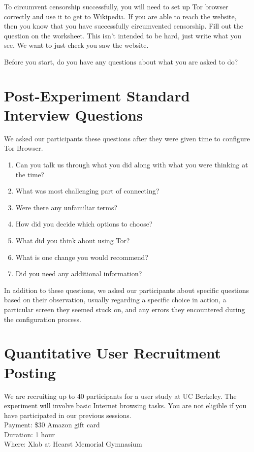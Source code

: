 \documentclass[USenglish,oneside,twocolumn]{article}
\begin{document}
To circumvent censorship successfully, you will need to set up Tor browser correctly and use it to get to Wikipedia. If you are able to reach the website, then you know that you have successfully circumvented censorship. Fill out the question on the worksheet. This isn't intended to be hard, just write what you see. We want to just check you saw the website. 

Before you start, do you have any questions about what you are asked to do? 

\section{Post-Experiment Standard Interview Questions}
We asked our participants these questions after they were given time to configure Tor Browser. \\

\begin{enumerate}
\item{Can you talk us through what you did along with what you were thinking at the time?}
\item{What was most challenging part of connecting?}
\item{Were there any unfamiliar terms?}
\item{How did you decide which options to choose?}
\item{What did you think about using Tor?}
\item{What is one change you would recommend?} 
\item{Did you need any additional information?} 
\end{enumerate}  

In addition to these questions, we asked our participants about specific questions based on their observation, usually regarding a specific choice in action, a particular screen they seemed stuck on, and any errors they encountered during the configuration process. 

\section{Quantitative User Recruitment Posting}
\label{quantitative-recruitment}
We are recruiting up to 40 participants for a user study at UC Berkeley. The experiment will involve basic Internet browsing tasks. You are not eligible if you have participated in our previous sessions.\\

\indent Payment: \$30 Amazon gift card\\
\indent Duration: 1 hour \\
\indent Where: Xlab at Hearst Memorial Gymnasium\\
\end{document}
